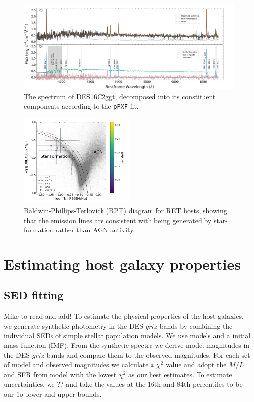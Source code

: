\documentclass[fleqn,usenatbib,]{mnras}
\newcommand{\mike}[1]{\color{cyan}#1 \color{black}}
\begin{document}
\begin{figure}
\includegraphics[width=\textwidth]{figs/gal_spec.png}
\caption{The spectrum of DES16C2ggt, decomposed into its constituent components according to the \texttt{pPXF} fit. 
\label{fig:host_spec}}
\end{figure}


\begin{figure}
\includegraphics[width=0.5\textwidth]{figs/RET_BPT.png}
\caption{Baldwin-Phillips-Terlovich (BPT) diagram for RET hosts, showing that the emission lines are consistent with being generated by star-formation rather than AGN activity.
\label{fig:bpt}}
\end{figure}

\section{Estimating host galaxy properties \label{sec:measure}}

\subsection{SED fitting \label{subsec:sedfit}}
\mike{Mike to read and add!}
To estimate the physical properties of the host galaxies, we generate synthetic photometry in the DES $griz$ bands by combining the individual SEDs of simple stellar population models. We use \citet{Bruzual2003} models and a \citet{Chabrier2003} initial mass function (IMF). From the synthetic spectra we derive model magnitudes in the DES $griz$ bands and compare them to the observed magnitudes. For each set of model and observed magnitudes we calculate a $\chi^2$ value and adopt the $M/L$ and SFR from model with the lowest $\chi^2$ as our best estimates. To estimate uncertainties, we ?? and take the values at the 16th and 84th percentiles to be our $1\sigma$ lower and upper bounds.
\end{document}
